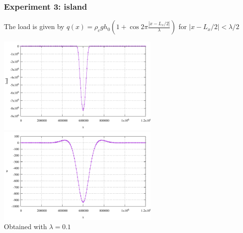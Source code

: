 \subsubsection*{Experiment 3: island}

The load is given by $q(x)=\rho_c g h_0 \left(1+\cos 2\pi \frac{|x-L_x/2|}{\lambda}\right) $
for $|x-L_x/2|<\lambda/2$ 

\begin{center}
\includegraphics[width=8cm]{python_codes/fieldstone_105/results/exp3/load}
\includegraphics[width=8cm]{python_codes/fieldstone_105/results/exp3/w.pdf}\\
{\captionfont Obtained with $\lambda=0.1$}
\end{center}



